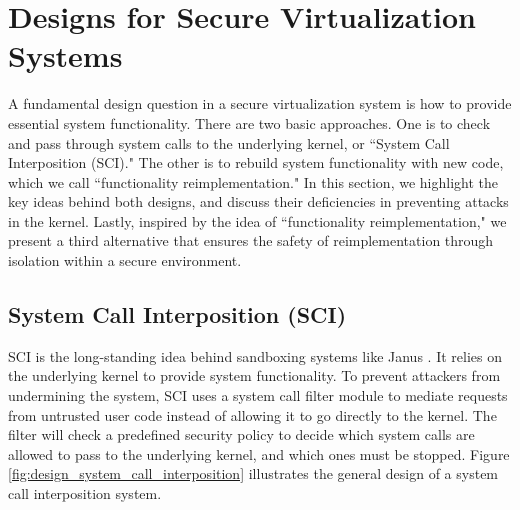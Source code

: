\section{Designs for Secure Virtualization Systems}
\label{sec.design}


A fundamental design question in a secure virtualization system
is how to provide essential system functionality.
There are two basic approaches.
One is to check and pass through system calls to the underlying kernel,
or ``System Call Interposition (SCI)."
The other is to rebuild system functionality with new code,
which we call ``functionality reimplementation."
In this section, we highlight the key ideas behind both designs, and
discuss their deficiencies in preventing attacks
in the kernel.
Lastly, inspired by the idea of ``functionality reimplementation,"
we present a third
alternative that ensures the safety of reimplementation through isolation
within a secure environment.

\subsection{System Call Interposition (SCI)}
SCI is the long-standing idea behind sandboxing systems like Janus
\cite{Janus0:96, Janus:99}. It relies on the underlying kernel
to provide system functionality. To prevent attackers from undermining the system,
SCI uses a system call filter module to mediate requests
from untrusted user code instead of allowing it to go directly to the kernel.
The filter will check a predefined security policy to decide which system calls are
allowed to pass to the underlying kernel, and which ones must be stopped.
%
Figure \ref{fig:design_system_call_interposition} illustrates the general design
of a system call interposition system.

